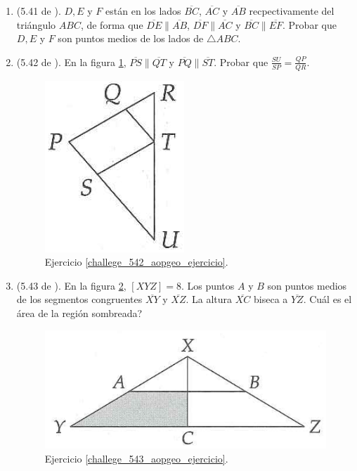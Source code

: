\begin{enumerate}
	\item \label{challege_541_aopgeo_ejercicio}(5.41 de \cite{Aops_Geometria}). $D,E$ y $F$ están en los lados $\overline{BC}$, $\overline{AC}$ y $\overline{AB}$ recpectivamente del triángulo $ABC$, de forma que $\overline{DE} \parallel \overline{AB}$, $\overline{DF} \parallel \overline{AC}$ y $\overline{BC} \parallel \overline{EF}$. Probar que $D,E$ y $F$ son puntos medios de los lados de $\triangle ABC$.
	
	\item \label{challege_542_aopgeo_ejercicio}(5.42 de \cite{Aops_Geometria}). En la figura \ref{challege_542_aopgeo_ejer}, $\overline{PS} \parallel \overline{QT}$ y $\overline{PQ} \parallel \overline{ST}$. Probar que $\frac{SU}{SP}=\frac{QP}{QR}$.
	\begin{figure}[H]
		\centering
		\includegraphics[width=0.3\linewidth]{Geometria/imgs/challege_542_aopgeo_ejer}
		\caption{Ejercicio \ref{challege_542_aopgeo_ejercicio}.}
		\label{challege_542_aopgeo_ejer}
	\end{figure}

	\item \label{challege_543_aopgeo_ejercicio}(5.43 de \cite{Aops_Geometria}). En la figura \ref{challege_543_aopgeo_ejer}, $[XYZ] = 8$. Los puntos $A$ y $B$ son puntos medios de los segmentos congruentes $\overline{XY}$ y $\overline{XZ}$. La altura $\overline{XC}$ biseca a $\overline{YZ}$. Cuál es el área de la región sombreada?
	\begin{figure}[H]
		\centering
		\includegraphics[width=0.4\linewidth]{Geometria/imgs/challege_543_aopgeo_ejer}
		\caption{Ejercicio \ref{challege_543_aopgeo_ejercicio}.}
		\label{challege_543_aopgeo_ejer}
	\end{figure}


\end{enumerate}
